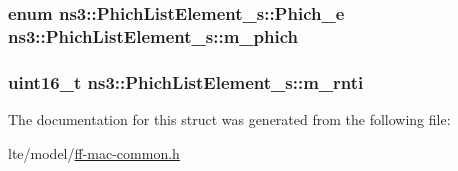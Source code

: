 \subsubsection[{\texorpdfstring{m\+\_\+phich}{m_phich}}]{\setlength{\rightskip}{0pt plus 5cm}enum {\bf ns3\+::\+Phich\+List\+Element\+\_\+s\+::\+Phich\+\_\+e}  ns3\+::\+Phich\+List\+Element\+\_\+s\+::m\+\_\+phich}\hypertarget{structns3_1_1PhichListElement__s_a8e55fd474803271637768959a514efaa}{}\label{structns3_1_1PhichListElement__s_a8e55fd474803271637768959a514efaa}
\subsubsection[{\texorpdfstring{m\+\_\+rnti}{m_rnti}}]{\setlength{\rightskip}{0pt plus 5cm}uint16\+\_\+t ns3\+::\+Phich\+List\+Element\+\_\+s\+::m\+\_\+rnti}\hypertarget{structns3_1_1PhichListElement__s_ad53f9fa2e8546edeb2380caead9e0eb1}{}\label{structns3_1_1PhichListElement__s_ad53f9fa2e8546edeb2380caead9e0eb1}


The documentation for this struct was generated from the following file\+:\begin{DoxyCompactItemize}
\item 
lte/model/\hyperlink{ff-mac-common_8h}{ff-\/mac-\/common.\+h}\end{DoxyCompactItemize}
